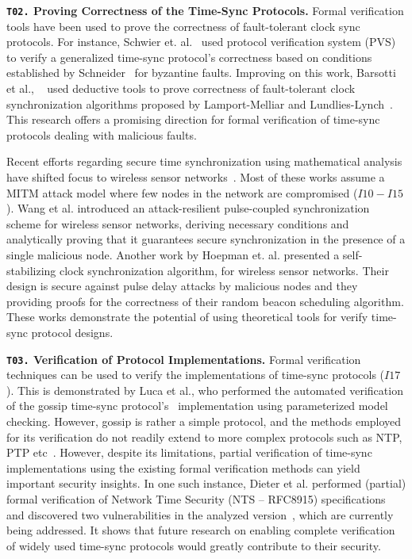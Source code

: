 \noindent\textbf{\texttt{T02.} Proving Correctness of the Time-Sync Protocols.} Formal verification tools have been used to prove the correctness of fault-tolerant clock sync protocols. For instance, Schwier et. al.~\cite{theory-MechanicalVO} used protocol verification system (PVS) to verify a generalized time-sync protocol's correctness based on conditions established by Schneider~\cite{theory-schneider-conditons} for byzantine faults. Improving on this work, Barsotti et al., ~\cite{theory-schneider, theory-deductivetools} used deductive tools to prove correctness of fault-tolerant clock synchronization algorithms proposed by Lamport-Melliar\cite{clock-sync-fault-presence} and Lundlies-Lynch~\cite{clock-sync-fault-tolerant}. This research offers a promising direction for formal verification of time-sync protocols dealing with malicious faults.

Recent efforts regarding secure time synchronization using mathematical analysis have shifted focus to wireless sensor networks~\cite{theory-attack-resilient-pulse-coupled, theory-self-stablizing}. Most of these works assume a MITM attack model where few nodes in the network are compromised ($I10-I15$). Wang et al.\cite{theory-attack-resilient-pulse-coupled} introduced an attack-resilient pulse-coupled synchronization scheme for wireless sensor networks, deriving necessary conditions and analytically proving that it guarantees secure synchronization in the presence of a single malicious node. Another work by Hoepman et. al.\cite{theory-self-stablizing} presented a self-stabilizing clock synchronization algorithm, for wireless sensor networks. Their design is secure against pulse delay attacks by malicious nodes and they providing proofs for the correctness of their random beacon scheduling algorithm. These works demonstrate the potential of using theoretical tools for verify time-sync protocol designs.

\noindent\textbf{\texttt{T03.} Verification of Protocol Implementations.} Formal verification techniques can be used to verify the implementations of time-sync protocols ($I17$). This is demonstrated by Luca et al., who performed the automated verification of the gossip time-sync protocol's~\cite{model-checking-gossip} implementation using parameterized model checking. However, gossip is rather a simple protocol, and the methods employed for its verification do not readily extend to more complex protocols such as NTP, PTP etc~\cite{net-sync-openchallenges}. However, despite its limitations, partial verification of time-sync implementations using the existing formal verification methods can yield important security insights. In one such instance, Dieter et al.\cite{theory-nts-specs} performed (partial) formal verification of Network Time Security (NTS -- RFC8915) specifications~\cite{nts-rfc} and discovered two vulnerabilities in the analyzed version~\cite{theory-nts-formal-analysis}, which are currently being addressed. It shows that future research on enabling complete verification of widely used time-sync protocols would greatly contribute to their security.

